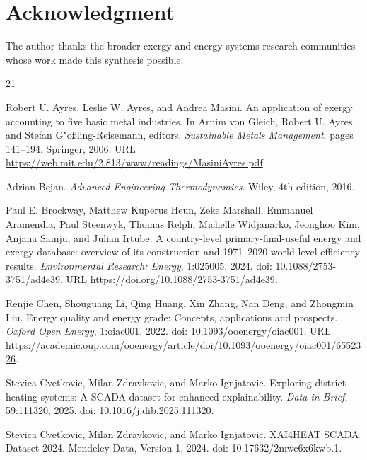 \documentclass[11pt]{article}
\begin{document}
\section*{Acknowledgment}

The author thanks the broader exergy and energy-systems research communities whose work made this synthesis possible.

\begin{thebibliography}{21}

Robert U. Ayres, Leslie W. Ayres, and Andrea Masini.
\newblock An application of exergy accounting to five basic metal industries.
\newblock In Arnim von Gleich, Robert U. Ayres, and Stefan G{"o}{\ss}ling-Reisemann, editors, \textit{Sustainable Metals Management}, pages 141--194. Springer, 2006.
\newblock URL \url{https://web.mit.edu/2.813/www/readings/MasiniAyres.pdf}.

Adrian Bejan.
\newblock \textit{Advanced Engineering Thermodynamics}.
\newblock Wiley, 4th edition, 2016.

Paul E. Brockway, Matthew Kuperus Heun, Zeke Marshall, Emmanuel Aramendia, Paul Steenwyk, Thomas Relph, Michelle Widjanarko, Jeonghoo Kim, Anjana Sainju, and Julian Irtube.
\newblock A country-level primary-final-useful energy and exergy database: overview of its construction and 1971--2020 world-level efficiency results.
\newblock \textit{Environmental Research: Energy}, 1:025005, 2024.
\newblock doi: 10.1088/2753-3751/ad4e39.
\newblock URL \url{https://doi.org/10.1088/2753-3751/ad4e39}.

Renjie Chen, Shouguang Li, Qing Huang, Xin Zhang, Nan Deng, and Zhongmin Liu.
\newblock Energy quality and energy grade: Concepts, applications and prospects.
\newblock \textit{Oxford Open Energy}, 1:oiac001, 2022.
\newblock doi: 10.1093/ooenergy/oiac001.
\newblock URL \url{https://academic.oup.com/ooenergy/article/doi/10.1093/ooenergy/oiac001/6552326}.

Stevica Cvetkovic, Milan Zdravkovic, and Marko Ignjatovic.
\newblock Exploring district heating systems: A SCADA dataset for enhanced explainability.
\newblock \textit{Data in Brief}, 59:111320, 2025.
\newblock doi: 10.1016/j.dib.2025.111320.

Stevica Cvetkovic, Milan Zdravkovic, and Marko Ignjatovic.
\newblock XAI4HEAT SCADA Dataset 2024.
\newblock Mendeley Data, Version 1, 2024.
\newblock doi: 10.17632/2mwc6x6kwb.1.


\end{thebibliography}
\end{document}
